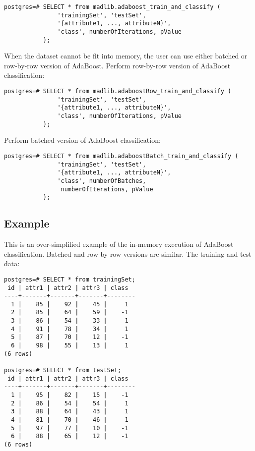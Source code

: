 \begin{verbatim}
postgres=# SELECT * from madlib.adaboost_train_and_classify (
               'trainingSet', 'testSet', 
               '{attribute1, ..., attributeN}', 
               'class', numberOfIterations, pValue
           );
\end{verbatim}

When the dataset cannot be fit into memory, the user can use either batched or row-by-row version of AdaBoost.
\vspace{\baselineskip}
{\raggedleft Perform row-by-row version of AdaBoost classification:}

\begin{verbatim}
postgres=# SELECT * from madlib.adaboostRow_train_and_classify (
               'trainingSet', 'testSet', 
               '{attribute1, ..., attributeN}', 
               'class', numberOfIterations, pValue
           );
\end{verbatim}

{\raggedleft Perform batched version of AdaBoost classification:}

\begin{verbatim}
postgres=# SELECT * from madlib.adaboostBatch_train_and_classify (
               'trainingSet', 'testSet', 
               '{attribute1, ..., attributeN}', 
               'class', numberOfBatches,
                numberOfIterations, pValue
           );
\end{verbatim}

\subsection*{Example}
This is an over-simplified example of the in-memory execution of AdaBoost classification. Batched and row-by-row versions are similar.
\vspace{\baselineskip}
{\raggedleft The training and test data:}

\begin{verbatim}
postgres=# SELECT * from trainingSet;
 id | attr1 | attr2 | attr3 | class 
----+-------+-------+-------+--------
  1 |    85 |    92 |    45 |     1 
  2 |    85 |    64 |    59 |    -1 
  3 |    86 |    54 |    33 |     1 
  4 |    91 |    78 |    34 |     1 
  5 |    87 |    70 |    12 |    -1 
  6 |    98 |    55 |    13 |     1 
(6 rows)

postgres=# SELECT * from testSet;
 id | attr1 | attr2 | attr3 | class 
----+-------+-------+-------+--------
  1 |    95 |    82 |    15 |    -1 
  2 |    86 |    54 |    54 |     1 
  3 |    88 |    64 |    43 |     1 
  4 |    81 |    70 |    46 |     1 
  5 |    97 |    77 |    10 |    -1 
  6 |    88 |    65 |    12 |    -1 
(6 rows)
\end{verbatim}

